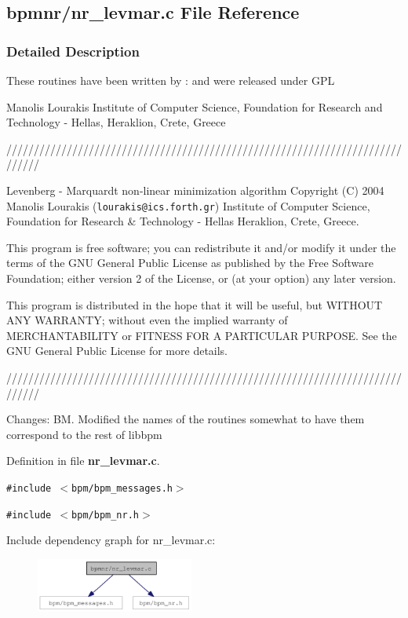 \subsection{bpmnr/nr\_\-levmar.c File Reference}
\label{nr__levmar_8c}


\subsubsection{Detailed Description}
These routines have been written by : and were released under GPL

Manolis Lourakis Institute of Computer Science, Foundation for Research and Technology - Hellas, Heraklion, Crete, Greece

//////////////////////////////////////////////////////////////////////////////

Levenberg - Marquardt non-linear minimization algorithm Copyright (C) 2004 Manolis Lourakis ({\tt lourakis@ics.forth.gr}) Institute of Computer Science, Foundation for Research \& Technology - Hellas Heraklion, Crete, Greece.

This program is free software; you can redistribute it and/or modify it under the terms of the GNU General Public License as published by the Free Software Foundation; either version 2 of the License, or (at your option) any later version.

This program is distributed in the hope that it will be useful, but WITHOUT ANY WARRANTY; without even the implied warranty of MERCHANTABILITY or FITNESS FOR A PARTICULAR PURPOSE. See the GNU General Public License for more details.

//////////////////////////////////////////////////////////////////////////////

Changes: BM. Modified the names of the routines somewhat to have them correspond to the rest of libbpm 

Definition in file {\bf nr\_\-levmar.c}.

{\tt \#include $<$bpm/bpm\_\-messages.h$>$}\par
{\tt \#include $<$bpm/bpm\_\-nr.h$>$}\par


Include dependency graph for nr\_\-levmar.c:\nopagebreak
\begin{figure}[H]
\begin{center}
\leavevmode
\includegraphics[width=147pt]{nr__levmar_8c__incl}
\end{center}
\end{figure}
